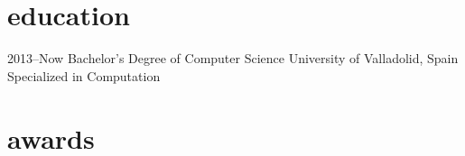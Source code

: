 \documentclass[]{friggeri-cv} %
\begin{document}

\section{education}

\begin{entrylist}


\entry
{2013--Now}
{Bachelor's Degree {\normalfont of Computer Science}}
{University of Valladolid, Spain}
{Specialized in Computation}



\end{entrylist}



\section{awards}
\end{document}
